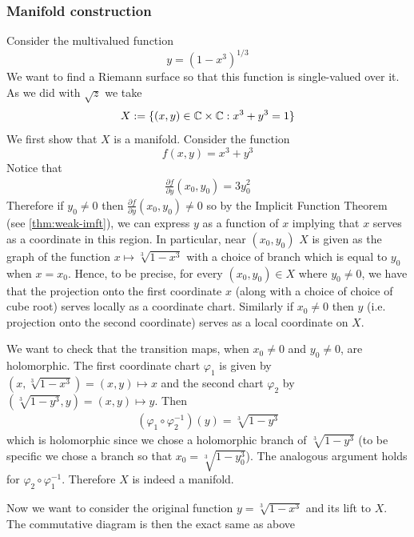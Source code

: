 \subsubsection{Manifold construction}
Consider the multivalued function
$$y = (1 - x^3)^{1/3}$$
We want to find a Riemann surface so that this function is single-valued over it. As we did with $\sqrt{z}$ we take 
\begin{align*}
    X := \{(x, y) \in \mathbb{C} \times \mathbb{C} : x^3 + y^3 = 1\}
\end{align*}
We first show that $X$ is a manifold. Consider the function
$$f(x, y) = x^3 + y^3$$
Notice that 
\begin{align*}
    \frac{\partial f}{\partial y}(x_0, y_0) = 3y_0^2
\end{align*}
Therefore if $y_0 \neq 0$ then $\frac{\partial f}{\partial y} (x_0, y_0) \neq 0$ so by the Implicit Function Theorem (see \autoref{thm:weak-imft}), we can express $y$ as a function of $x$ implying that $x$ serves as a coordinate in this region. In particular, near $(x_0, y_0)$ $X$ is given as the graph of the function $x \mapsto \sqrt[3]{1 - x^3}$ with a choice of branch which is equal to $y_0$ when $x = x_0$. Hence, to be precise, for every $(x_0, y_0) \in X$ where $y_0 \neq 0$, we have that the projection onto the first coordinate $x$ (along with a choice of choice of cube root) serves locally as a coordinate chart. Similarly if $x_0 \neq 0$ then $y$ (i.e. projection onto the second coordinate) serves as a local coordinate on $X$. 

We want to check that the transition maps, when $x_0 \neq 0$ and $y_0 \neq 0$, are holomorphic. The first coordinate chart $\varphi_1$ is given by $(x, \sqrt[3]{1 - x^3}) = (x, y) \mapsto x$ and the second chart $\varphi_2$ by $(\sqrt[3]{1 - y^3}, y) = (x, y) \mapsto y$. Then 
\begin{align*}
    (\varphi_1 \circ \varphi_2^{-1})(y) = \sqrt[3]{1 - y^3}
\end{align*}
which is holomorphic since we chose a holomorphic branch of $\sqrt[3]{1 - y^3}$ (to be specific we chose a branch so that $x_0 = \sqrt[3]{1 - y_0^3}$). The analogous argument holds for $\varphi_2 \circ \varphi_1^{-1}$. Therefore $X$ is indeed a manifold.

Now we want to consider the original function $y = \sqrt[3]{1 - x^3}$ and its lift to $X$. The commutative diagram is then the exact same as above

